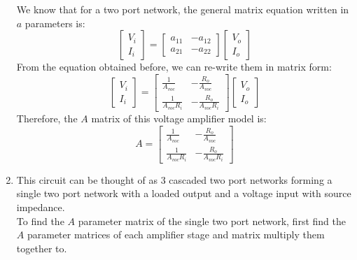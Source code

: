 \begin{enumerate}
{	We know that for a two port network, the general matrix
	equation written in $a$ parameters is:
	$$ \left[ \begin{matrix}
	V_i \\ 
	I_i
	\end{matrix}\right] = \left[ \begin{matrix}
	a_{11} & -a_{12} \\ 
	a_{21} & -a_{22}
	\end{matrix}  \right] \left[ \begin{matrix}
	V_o \\ 
	I_o
	\end{matrix}  \right]  $$	
	From the equation obtained before, we can re-write them in matrix form:
	$$ \left[ \begin{matrix}
	V_i \\ 
	I_i
	\end{matrix}\right] = \left[ \begin{matrix}
	\frac{1}{A_{voc}} 		& -\frac{R_o}{A_{voc}} \\[6pt] 
	\frac{1}{A_{voc}R_i}	& -\frac{R_o}{A_{voc}R_i}
	\end{matrix}  \right] \left[ \begin{matrix}
	V_o \\ 
	I_o
	\end{matrix}  \right]  $$	
	}
	Therefore, the $A$ matrix of this voltage amplifier model is:
	$$ A = 
	\left[ \begin{matrix}
	\frac{1}{A_{voc}} 		& -\frac{R_o}{A_{voc}} \\[6pt] 
	\frac{1}{A_{voc}R_i}	& -\frac{R_o}{A_{voc}R_i}
	\end{matrix}  \right] $$
	
	\item{
	This circuit can be thought of as 3 cascaded two port networks forming 
	a single two port network with a loaded output and a voltage input with 
	source impedance.\\
	To find the $A$ parameter matrix of the single two port network, first 
	find the $A$ parameter matrices of each amplifier stage and matrix 
	multiply them together to.
	
}
\end{enumerate}

